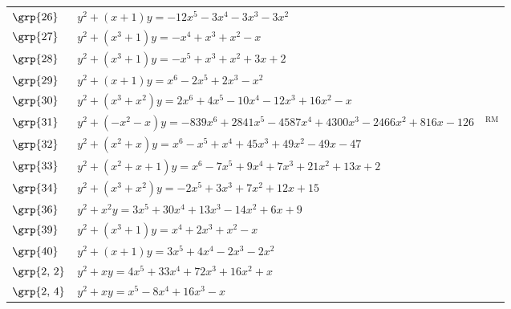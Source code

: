 \begin{longtable}{@{}>{\raggedright\arraybackslash}p{1.35cm}
 >{\raggedright\arraybackslash}p{}
 >{\raggedright\arraybackslash}p{1.1cm}@{}}
$\grp{26}$ & \href{https://alpha.lmfdb.org/Genus2Curve/Q/?jump=[[0,0,-3,-3,-3,-12],[1,1]]}{$y^2 + (x+1)y = -12x^{5}-3x^{4}-3x^{3}-3x^{2}$} & \cite{Leprevost1993}\\
$\grp{27}$ & \href{https://www.lmfdb.org/Genus2Curve/Q/604/a/9664/2}{$y^2 + (x^{3}+1)y = -x^{4}+x^{3}+x^{2}-x$} & \cite{Howe2015}\\
$\grp{28}$ & \href{https://www.lmfdb.org/Genus2Curve/Q/249/a/6723/1}{$y^2 + (x^{3}+1)y = -x^{5}+x^{3}+x^{2}+3x+2$} & \cite{PP2012,PZP2013}\\
$\grp{29}$ & \href{https://www.lmfdb.org/Genus2Curve/Q/976/a/999424/1}{$y^2 + (x+1)y = x^{6}-2x^{5}+2x^{3}-x^{2}$} & \cite{Leprevost1993}\\
$\grp{30}$ & \href{https://alpha.lmfdb.org/Genus2Curve/Q/?jump=[[0,-1,16,-12,-10,4,2],[0,0,1,1]]}{$y^2 + (x^{3}+x^{2})y = 2x^{6}+4x^{5}-10x^{4}-12x^{3}+16x^{2}-x$} & \cite{PP2015}\\
$\grp{31}$ & $y^2 + (-x^{2}-x)y = -839x^{6}+2841x^{5}-4587x^{4}+4300x^{3}-2466x^{2}+816x-126$ & \cite{costa}$^{\text{RM}}$\\
$\grp{32}$ & \href{https://alpha.lmfdb.org/Genus2Curve/Q/?jump=[[-47,-49,49,45,1,-1,1],[0,1,1]]}{$y^2 + (x^{2}+x)y = x^{6}-x^{5}+x^{4}+45x^{3}+49x^{2}-49x-47$} & \cite{Elkies2002}\\
$\grp{33}$ & \href{https://alpha.lmfdb.org/Genus2Curve/Q/?jump=[[2,13,21,7,9,-7,1],[1,1,1]]}{$y^2 + (x^{2}+x+1)y = x^{6}-7x^{5}+9x^{4}+7x^{3}+21x^{2}+13x+2$} & \cite{PP2012b,PZP2013}\\
$\grp{34}$ & \href{https://alpha.lmfdb.org/Genus2Curve/Q/?jump=[[15,12,7,3,0,-2],[0,0,1,1]]}{$y^2 + (x^{3}+x^{2})y = -2x^{5}+3x^{3}+7x^{2}+12x+15$} & \cite{Elkies2002}\\
$\grp{36}$ & \href{https://alpha.lmfdb.org/Genus2Curve/Q/?jump=[[9,6,-14,13,30,3],[0,0,1]]}{$y^2 + x^{2}y = 3x^{5}+30x^{4}+13x^{3}-14x^{2}+6x+9$} & \cite{PP2015}\\
$\grp{39}$ & \href{https://www.lmfdb.org/Genus2Curve/Q/1116/a/214272/1}{$y^2 + (x^{3}+1)y = x^{4}+2x^{3}+x^{2}-x$} & \cite{Elkies2002}\\
$\grp{40}$ & \href{https://alpha.lmfdb.org/Genus2Curve/Q/?jump=[[0,0,-2,-2,4,3],[1,1]]}{$y^2 + (x+1)y = 3x^{5}+4x^{4}-2x^{3}-2x^{2}$} & \cite{Elkies2002}\\
$\grp{2,\,2}$ & \href{https://www.lmfdb.org/Genus2Curve/Q/464/a/29696/2}{$y^2 + xy = 4x^{5}+33x^{4}+72x^{3}+16x^{2}+x$} & \cite{BSSVY}\\
$\grp{2,\,4}$ & \href{https://www.lmfdb.org/Genus2Curve/Q/997/a/997/1}{$y^2 + xy = x^{5}-8x^{4}+16x^{3}-x$} & \cite{BSSVY}\\

\end{longtable}
